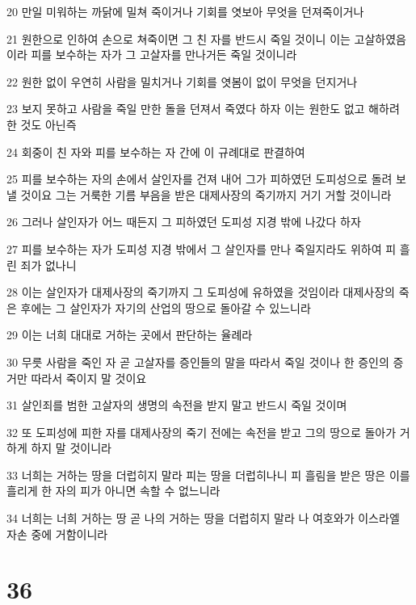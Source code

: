 \par 20 만일 미워하는 까닭에 밀쳐 죽이거나 기회를 엿보아 무엇을 던져죽이거나
\par 21 원한으로 인하여 손으로 쳐죽이면 그 친 자를 반드시 죽일 것이니 이는 고살하였음이라 피를 보수하는 자가 그 고살자를 만나거든 죽일 것이니라
\par 22 원한 없이 우연히 사람을 밀치거나 기회를 엿봄이 없이 무엇을 던지거나
\par 23 보지 못하고 사람을 죽일 만한 돌을 던져서 죽였다 하자 이는 원한도 없고 해하려 한 것도 아닌즉
\par 24 회중이 친 자와 피를 보수하는 자 간에 이 규례대로 판결하여
\par 25 피를 보수하는 자의 손에서 살인자를 건져 내어 그가 피하였던 도피성으로 돌려 보낼 것이요 그는 거룩한 기름 부음을 받은 대제사장의 죽기까지 거기 거할 것이니라
\par 26 그러나 살인자가 어느 때든지 그 피하였던 도피성 지경 밖에 나갔다 하자
\par 27 피를 보수하는 자가 도피성 지경 밖에서 그 살인자를 만나 죽일지라도 위하여 피 흘린 죄가 없나니
\par 28 이는 살인자가 대제사장의 죽기까지 그 도피성에 유하였을 것임이라 대제사장의 죽은 후에는 그 살인자가 자기의 산업의 땅으로 돌아갈 수 있느니라
\par 29 이는 너희 대대로 거하는 곳에서 판단하는 율례라
\par 30 무릇 사람을 죽인 자 곧 고살자를 증인들의 말을 따라서 죽일 것이나 한 증인의 증거만 따라서 죽이지 말 것이요
\par 31 살인죄를 범한 고살자의 생명의 속전을 받지 말고 반드시 죽일 것이며
\par 32 또 도피성에 피한 자를 대제사장의 죽기 전에는 속전을 받고 그의 땅으로 돌아가 거하게 하지 말 것이니라
\par 33 너희는 거하는 땅을 더럽히지 말라 피는 땅을 더럽히나니 피 흘림을 받은 땅은 이를 흘리게 한 자의 피가 아니면 속할 수 없느니라
\par 34 너희는 너희 거하는 땅 곧 나의 거하는 땅을 더럽히지 말라 나 여호와가 이스라엘 자손 중에 거함이니라

\chapter{36}


